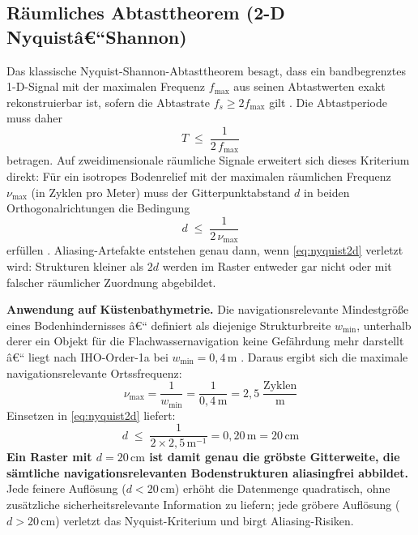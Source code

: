 ﻿\documentclass[a4paper,12pt]{article}
\theoremstyle{definition}
\begin{document}
\subsection{Räumliches Abtasttheorem (2-D Nyquistâ€“Shannon)}

Das klassische Nyquist-Shannon-Abtasttheorem besagt, dass ein bandbegrenztes
1-D-Signal mit der maximalen Frequenz $f_{\max}$ aus seinen Abtastwerten
exakt rekonstruierbar ist, sofern die Abtastrate $f_s \geq 2 f_{\max}$ gilt
\cite{shannon1949, nyquist1928}.
Die Abtastperiode muss daher
\begin{equation}
  T \;\leq\; \frac{1}{2\,f_{\max}}
  \label{eq:nyquist1d}
\end{equation}
betragen. Auf zweidimensionale räumliche Signale erweitert sich dieses Kriterium
direkt: Für ein isotropes Bodenrelief mit der maximalen räumlichen Frequenz
$\nu_{\max}$ (in Zyklen pro Meter) muss der Gitterpunktabstand $d$ in beiden
Orthogonalrichtungen die Bedingung
\begin{equation}
  d \;\leq\; \frac{1}{2\,\nu_{\max}}
  \label{eq:nyquist2d}
\end{equation}
erfüllen \cite{oppenheim1996, marks2009}. Aliasing-Artefakte entstehen
genau dann, wenn \eqref{eq:nyquist2d} verletzt wird: Strukturen kleiner als
$2d$ werden im Raster entweder gar nicht oder mit falscher räumlicher
Zuordnung abgebildet.

\medskip\noindent
\textbf{Anwendung auf Küstenbathymetrie.}
Die navigationsrelevante Mindestgröße eines Bodenhindernisses â€“ definiert als
diejenige Strukturbreite $w_{\min}$, unterhalb derer ein Objekt für die
Flachwassernavigation keine Gefährdung mehr darstellt â€“ liegt nach
IHO-Order-1a bei $w_{\min} = 0{,}4\,\text{m}$ \cite{iho2020}.
Daraus ergibt sich die maximale navigationsrelevante Ortssfrequenz:
\begin{equation}
  \nu_{\max} = \frac{1}{w_{\min}} = \frac{1}{0{,}4\,\text{m}}
             = 2{,}5\;\frac{\text{Zyklen}}{\text{m}}
  \label{eq:numax}
\end{equation}
Einsetzen in \eqref{eq:nyquist2d} liefert:
\begin{equation}
  d \;\leq\; \frac{1}{2 \times 2{,}5\,\text{m}^{-1}}
             = 0{,}20\,\text{m} = 20\,\text{cm}
  \label{eq:dmax}
\end{equation}
\textbf{Ein Raster mit $d = 20\,\text{cm}$ ist damit genau die gröbste
Gitterweite, die sämtliche navigationsrelevanten Bodenstrukturen
aliasingfrei abbildet.} Jede feinere Auflösung ($d < 20\,\text{cm}$)
erhöht die Datenmenge quadratisch, ohne zusätzliche
sicherheitsrele\-vante Information zu liefern; jede gröbere
Auflösung ($d > 20\,\text{cm}$) verletzt das Nyquist-Kriterium und
birgt Aliasing-Risiken.
\end{document}
